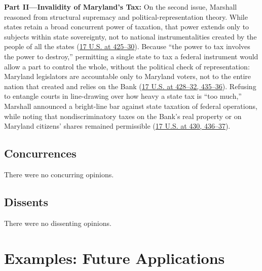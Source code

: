 \documentclass[12pt]{article}
\begin{document}
\textbf{Part II---Invalidity of Maryland's Tax:} On the second issue, Marshall reasoned from structural supremacy and political-representation theory. While states retain a broad concurrent power of taxation, that power extends only to subjects within state sovereignty, not to national instrumentalities created by the people of all the states (\href{https://supreme.justia.com/cases/federal/us/17/316/}{17 U.S. at 425--30}). Because ``the power to tax involves the power to destroy,'' permitting a single state to tax a federal instrument would allow a part to control the whole, without the political check of representation: Maryland legislators are accountable only to Maryland voters, not to the entire nation that created and relies on the Bank (\href{https://supreme.justia.com/cases/federal/us/17/316/}{17 U.S. at 428--32, 435--36}). Refusing to entangle courts in line-drawing over how heavy a state tax is ``too much,'' Marshall announced a bright-line bar against state taxation of federal operations, while noting that nondiscriminatory taxes on the Bank's real property or on Maryland citizens' shares remained permissible (\href{https://supreme.justia.com/cases/federal/us/17/316/}{17 U.S. at 430, 436--37}).

\subsection{Concurrences}

There were no concurring opinions.

\subsection{Dissents}

There were no dissenting opinions.

\section{Examples: Future Applications}
\end{document}

